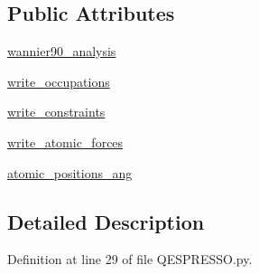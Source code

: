 \subsection*{Public Attributes}
\begin{DoxyCompactItemize}
\item 
\hyperlink{class_d_f_t___k_i_t_1_1calculator_1_1_q_e_s_p_r_e_s_s_o_1_1calculator___q_e_s_p_r_e_s_s_o_a592277136beac440bab01bf76b843c2e}{wannier90\+\_\+analysis}
\item 
\hyperlink{class_d_f_t___k_i_t_1_1calculator_1_1_q_e_s_p_r_e_s_s_o_1_1calculator___q_e_s_p_r_e_s_s_o_a5777156c6b8e7acf49acaaefb29dc014}{write\+\_\+occupations}
\item 
\hyperlink{class_d_f_t___k_i_t_1_1calculator_1_1_q_e_s_p_r_e_s_s_o_1_1calculator___q_e_s_p_r_e_s_s_o_ac3dc7e099761294cc4fc50a9d56de21b}{write\+\_\+constraints}
\item 
\hyperlink{class_d_f_t___k_i_t_1_1calculator_1_1_q_e_s_p_r_e_s_s_o_1_1calculator___q_e_s_p_r_e_s_s_o_ad4f633886d1b745fec03b1b18397da75}{write\+\_\+atomic\+\_\+forces}
\item 
\hyperlink{class_d_f_t___k_i_t_1_1calculator_1_1_q_e_s_p_r_e_s_s_o_1_1calculator___q_e_s_p_r_e_s_s_o_a46e4b3b7b81088b086beb9cd5cd64c3c}{atomic\+\_\+positions\+\_\+ang}
\end{DoxyCompactItemize}


\subsection{Detailed Description}


Definition at line 29 of file Q\+E\+S\+P\+R\+E\+S\+S\+O.\+py.




